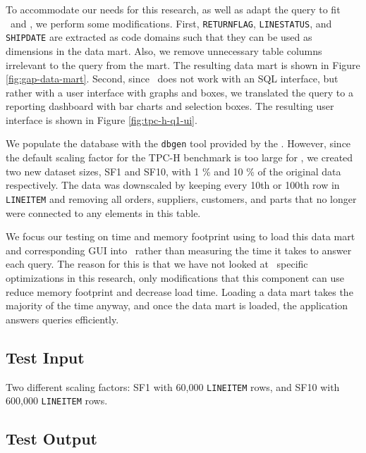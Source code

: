

To accommodate our needs for this research, as well as adapt the query to fit \gap~and \gd, we perform some modifications. First, \texttt{RETURNFLAG}, \texttt{LINESTATUS}, and \texttt{SHIPDATE} are extracted as code domains such that they can be used as dimensions in the data mart. Also, we remove unnecessary table columns irrelevant to the query from the mart. The resulting data mart is shown in Figure \ref{fig:gap-data-mart}. Second, since \gd~does not work with an SQL interface, but rather with a user interface with graphs and boxes, we translated the query to a reporting dashboard with bar charts and selection boxes. The resulting user interface is shown in Figure \ref{fig:tpc-h-q1-ui}. 

We populate the database with the \texttt{dbgen} tool provided by the . However, since the default scaling factor for the TPC-H benchmark is too large for \gap, we created two new dataset sizes, SF1 and SF10, with 1 \% and 10 \% of the original data respectively. The data was downscaled by keeping every 10th or 100th row in \texttt{LINEITEM} and removing all orders, suppliers, customers, and parts that no longer were connected to any elements in this table. 

We focus our testing on time and memory footprint using to load this data mart and corresponding GUI into \gd~rather than measuring the time it takes to answer each query. The reason for this is that we have not looked at \gd~specific optimizations in this research, only modifications that this component can use reduce memory footprint and decrease load time. Loading a data mart takes the majority of the time anyway, and once the data mart is loaded, the application answers queries efficiently.

\subsection{Test Input}
\label{sub:Test Input}

Two different scaling factors: SF1 with 60,000 \texttt{LINEITEM} rows, and SF10 with 600,000 \texttt{LINEITEM} rows.

\subsection{Test Output}
\label{sub:Test Output}

